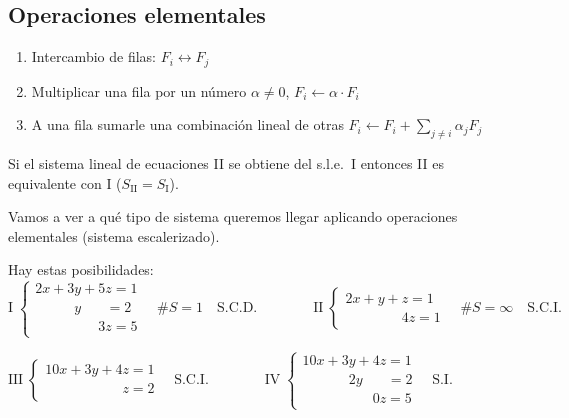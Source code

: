 \documentclass[11pt,a4paper]{article}
\begin{document}
\subsection{Operaciones elementales}

\begin{enumerate}[label=\arabic*)]
  \item Intercambio de filas: $F_i\leftrightarrow F_j$
  \item Multiplicar una fila por un número $\alpha\neq0$, $F_i\leftarrow\alpha\cdot F_i$
  \item A una fila sumarle una combinación lineal de otras $F_i\leftarrow F_i+\sum_{j\neq i}\alpha_jF_j$
\end{enumerate}

\begin{teorema}
Si el sistema lineal de ecuaciones II se obtiene del s.l.e.\ I entonces II es equivalente con I ($S_{\text{II}}=S_{\text{I}}$).
\end{teorema}

Vamos a ver a qué tipo de sistema queremos llegar aplicando operaciones elementales (sistema escalerizado).

Hay estas posibilidades:
\[
\text{I}\;\begin{cases}
2x+3y+5z=1\\
\phantom{2x+3}y\phantom{+5z}=2\\
\phantom{2x+3y+}3z=5
\end{cases}\quad \#S=1\quad\text{S.C.D.}
\qquad\qquad
\text{II}\;\begin{cases}
2x+y+z=1\\
\phantom{2x+y+}4z=1
\end{cases}\quad \#S=\infty\quad\text{S.C.I.}
\]
\begin{center}
$\displaystyle
\text{III}\;\begin{cases}
10x+3y+4z=1\\
\phantom{10x+3y+4}z=2
\end{cases}\quad\text{S.C.I.}
\qquad\qquad
\text{IV}\;\begin{cases}
10x+3y+4z=1\\
\phantom{10x+3}2y\phantom{+4z}=2\\
\phantom{10x+3y+}0z=5
\end{cases}\quad\text{S.I.}$
\end{center}

\end{document}
